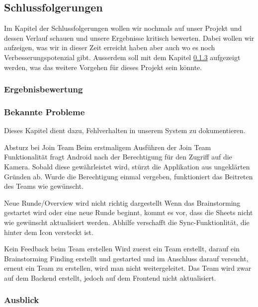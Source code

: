 \subsection{Schlussfolgerungen}
Im Kapitel der Schlussfolgerungen wollen wir nochmals auf unser Projekt und dessen Verlauf schauen und unsere Ergebnisse kritisch bewerten. Dabei wollen wir aufzeigen, was wir in dieser Zeit erreicht haben aber auch wo es noch Verbesserungspotenzial gibt. Ausserdem soll mit dem Kapitel \ref{subsub:Ausblick} aufgezeigt werden, was das weitere Vorgehen für dieses Projekt sein könnte.

\subsubsection{Ergebnisbewertung}


\subsubsection{Bekannte Probleme}
Dieses Kapitel dient dazu, Fehlverhalten in unserem System zu dokumentieren.


\begin{basedescript}{
		\desclabelstyle{\multilinelabel}
		\desclabelwidth{4.5cm}
		\setlength{\itemsep}{5ex}}
	\item [Absturz bei Join Team] Beim erstmaligem Ausführen der Join Team Funktionalität fragt Android nach der Berechtigung für den Zugriff auf die Kamera. Sobald diese gewährleistet wird, stürzt die Applikation aus ungeklärten Gründen ab. Wurde die Berechtigung einmal vergeben, funktioniert das Beitreten des Teams wie gewünscht.
	
	\item [Neue Runde/Overview wird nicht richtig dargestellt] 
	Wenn das Brainstorming gestartet wird oder eine neue Runde beginnt, kommt es vor, dass die Sheets nicht wie gewünscht aktualisiert werden. Abhilfe verschafft die Sync-Funktionlität, die hinter dem Icon versteckt ist.
	
	\item [Kein Feedback beim Team erstellen] 
	Wird zuerst ein Team erstellt, darauf ein Brainstorming Finding erstellt und gestarted und im Anschluss darauf versucht, erneut ein Team zu erstellen, wird man nicht weitergeleitet. Das Team wird zwar auf dem Backend erstellt, jedoch auf dem Frontend nicht aktualisiert.
\end{basedescript}


\subsubsection{Ausblick}
\label{subsub:Ausblick}



